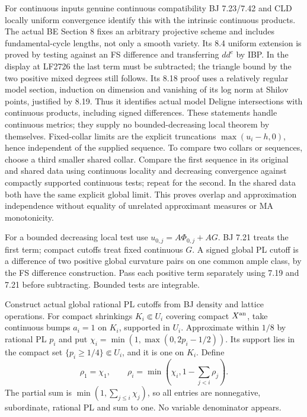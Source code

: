 \documentclass[
  10pt,
]{article}
\begin{document}
For continuous inputs genuine continuous compatibility BJ 7.23/7.42 and
CLD locally uniform convergence identify this with the intrinsic
continuous products. The actual BE Section 8 fixes an arbitrary
projective scheme and includes fundamental-cycle lengths, not only a
smooth variety. Its 8.4 uniform extension is proved by testing against
an FS difference and transferring \(dd^c\) by IBP. In the display at
LF2726 the last term must be subtracted; the triangle bound by the two
positive mixed degrees still follows. Its 8.18 proof uses a relatively
regular model section, induction on dimension and vanishing of its log
norm at Shilov points, justified by 8.19. Thus it identifies actual
model Deligne intersections with continuous products, including signed
differences. These statements handle continuous metrics; they supply no
bounded-decreasing local theorem by themselves. Fixed-collar limits are
the explicit truncations \(\max(u_i-h,0)\), hence independent of the
supplied sequence. To compare two collars or sequences, choose a third
smaller shared collar. Compare the first sequence in its original and
shared data using continuous locality and decreasing convergence against
compactly supported continuous tests; repeat for the second. In the
shared data both have the same explicit global limit. This proves
overlap and approximation independence without equality of unrelated
approximant measures or MA monotonicity.

For a bounded decreasing local test use \(u_{0,j}=A\Phi_{0,j}+AG\). BJ
7.21 treats the first term; compact cutoffs treat fixed continuous
\(G\). A signed global PL cutoff is a difference of two positive global
curvature pairs on one common ample class, by the FS difference
construction. Pass each positive term separately using 7.19 and 7.21
before subtracting. Bounded tests are integrable.

Construct actual global rational PL cutoffs from BJ density and lattice
operations. For compact shrinkings \(K_i\Subset U_i\) covering compact
\(X^{\rm an}\), take continuous bumps \(a_i=1\) on \(K_i\), supported in
\(U_i\). Approximate within \(1/8\) by rational PL \(p_i\) and put
\(\chi_i=\min(1,\max(0,2p_i-1/2))\). Its support lies in the compact set
\(\{p_i\ge1/4\}\Subset U_i\), and it is one on \(K_i\). Define
\[\rho_1=\chi_1,\qquad \rho_i=\min(\chi_i,1-\sum_{j<i}\rho_j). \tag{16}\]
The partial sum is \(\min(1,\sum_{j\le i}\chi_j)\), so all entries are
nonnegative, subordinate, rational PL and sum to one. No variable
denominator appears.
\end{document}

